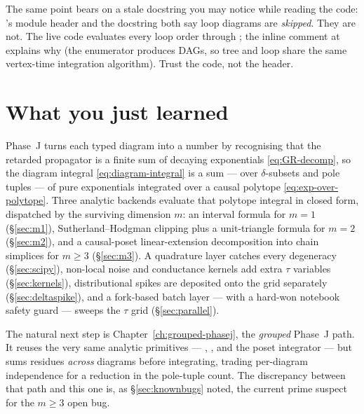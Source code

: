 \begin{note}
The same point bears on a stale docstring you may notice while reading the code:
's module header and the 
docstring both say loop diagrams are \emph{skipped}. They are not. The live code
evaluates every loop order through ; the inline comment at
 explains why (the enumerator produces DAGs, so tree and
loop share the same vertex-time integration algorithm). Trust the code, not the
header.
\end{note}

\section{What you just learned}

Phase~J turns each typed diagram into a number by recognising that the retarded
propagator is a finite sum of decaying exponentials \eqref{eq:GR-decomp}, so the
diagram integral \eqref{eq:diagram-integral} is a sum --- over $\delta$-subsets
and pole tuples --- of pure exponentials integrated over a causal polytope
\eqref{eq:exp-over-polytope}. Three analytic backends evaluate that polytope
integral in closed form, dispatched by the surviving dimension $m$: an interval
formula for $m=1$ (\S\ref{sec:m1}), Sutherland--Hodgman clipping plus a
unit-triangle formula for $m=2$ (\S\ref{sec:m2}), and a causal-poset
linear-extension decomposition into chain simplices for $m\ge 3$
(\S\ref{sec:m3}). A  quadrature layer catches every degeneracy
(\S\ref{sec:scipy}), non-local noise and conductance kernels add extra
$\tau$ variables (\S\ref{sec:kernels}), distributional spikes are deposited onto
the grid separately (\S\ref{sec:deltaspike}), and a fork-based batch layer ---
with a hard-won notebook safety guard --- sweeps the $\tau$ grid
(\S\ref{sec:parallel}).

The natural next step is Chapter~\ref{ch:grouped-phasej}, the \emph{grouped}
Phase~J path. It reuses the very same analytic primitives ---
, ,
and the poset integrator --- but sums residues \emph{across} diagrams before
integrating, trading per-diagram independence for a reduction in the pole-tuple
count. The discrepancy between that path and this one is, as
\S\ref{sec:knownbugs} noted, the current prime suspect for the $m\ge 3$ open bug.
